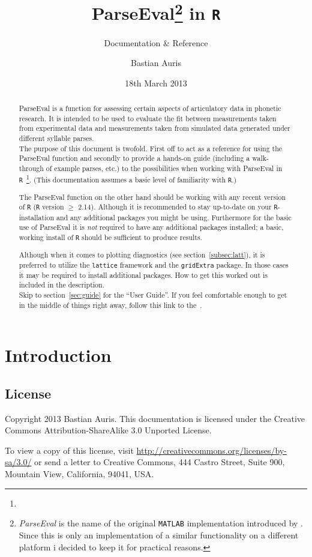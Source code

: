 \documentclass[
draft=false,
toc=graduated,
listof=totoc,
headsepline=true,
]%
{scrartcl}
\title{ParseEval\footnote{\emph{ParseEval} is the name of the original \texttt{MATLAB} implementation introduced by \textcite{Shaw2009}. Since this is only an implementation of a similar functionality on a different platform i decided to keep it for practical reasons.} in \texttt{R}}
\subtitle{Documentation \& Reference}
\author{Bastian Auris}
\date{18th March 2013}
\begin{document}
\maketitle
\begin{abstract}
ParseEval is a function for assessing certain aspects of articulatory data in phonetic research. It is intended to be used to evaluate the fit between measurements taken from experimental data and measurements taken from simulated data generated under different syllable parses.\\
The purpose of this document is twofold. First off to act as a reference for using the ParseEval function and secondly to provide a hands-on guide (including a walk-through of example parses, etc.) to the possibilities when working with ParseEval in \texttt{R}~\footnote{}. (This documentation assumes a basic level of familiarity with \texttt{R}.)

The ParseEval function on the other hand should be working with any recent version of \texttt{R} (\texttt{R} version $\geq$ 2.14). Although it is recommended to stay up-to-date on your \texttt{R}-installation and any additional packages you might be using.
Furthermore for the basic use of ParseEval it is \emph{not} required to have any additional packages installed; a basic, working install of \texttt{R} should be sufficient to produce results.

Although when it comes to plotting diagnostics (see section~\ref{subsec:latt}), it is preferred to utilize the \texttt{lattice} framework and the \texttt{gridExtra} package. In those cases it may be required to install additional packages. How to get this worked out is included in the description.\\
Skip to section~\ref{sec:guide} for the \enquote{User Guide}. If you feel comfortable enough to get in the middle of things right away, follow this link to the~.
\end{abstract}
\pagebreak
\tableofcontents
\listoffigures
\listoftables
\pagebreak
\section{Introduction}
\label{sec:intro}
\subsection{License}
Copyright \textcopyright{} 2013 Bastian Auris. This documentation is licensed under the Creative Commons Attribution-ShareAlike 3.0 Unported License.\par%
To view a copy of this license, visit \url{http://creativecommons.org/licenses/by-sa/3.0/} or send a letter to Creative Commons, 444 Castro Street, Suite 900, Mountain View, California, 94041, USA.
\end{document}
